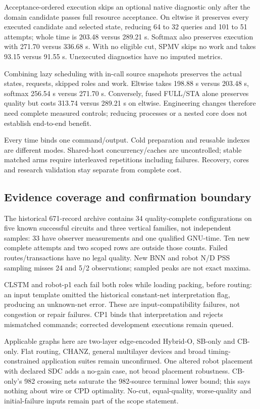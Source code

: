 \documentclass[conference,10pt]{IEEEtran}
\begin{document}
Acceptance-ordered execution skips an optional native diagnostic only after the domain candidate passes full resource acceptance. On eltwise it preserves every executed candidate and selected state, reducing 64 to 32 queries and 101 to 51 attempts; whole time is 203.48 versus 289.21 s. Softmax also preserves execution with 271.70 versus 336.68 s. With no eligible cut, SPMV skips no work and takes 93.15 versus 91.55 s. Unexecuted diagnostics have no imputed metrics.

Combining lazy scheduling with in-call source snapshots preserves the actual states, requests, skipped roles and work. Eltwise takes 198.88 s versus 203.48 s, softmax 256.54 s versus 271.70 s. Conversely, fused FULL/STA alone preserves quality but costs 313.74 versus 289.21 s on eltwise. Engineering changes therefore need complete measured controls; reducing processes or a nested core does not establish end-to-end benefit.

Every time binds one command/output. Cold preparation and reusable indexes are different modes. Shared-host concurrency/caches are uncontrolled; stable matched arms require interleaved repetitions including failures. Recovery, cores and research validation stay separate from complete cost.

\subsection{Evidence coverage and confirmation boundary}
The historical 671-record archive contains 34 quality-complete configurations on five known successful circuits and three vertical families, not independent samples: 33 have observer measurements and one qualified GNU-time. Ten new complete attempts and two scoped rows are outside those counts. Failed routes/transactions have no legal quality. New BNN and robot N/D PSS sampling misses 24 and 5/2 observations; sampled peaks are not exact maxima.

CLSTM and robot-p1 each fail both roles while loading packing, before routing: an input template omitted the historical constant-net interpretation flag, producing an unknown-net error. These are input-compatibility failures, not congestion or repair failures. CP1 binds that interpretation and rejects mismatched commands; corrected development executions remain queued.

Applicable graphs here are two-layer edge-encoded Hybrid-O, SB-only and CB-only. Flat routing, CHANZ, general multilayer devices and broad timing-constrained application suites remain unconfirmed. One altered robot placement with declared SDC adds a no-gain case, not broad placement robustness. CB-only's 982 crossing nets saturate the 982-source terminal lower bound; this says nothing about wire or CPD optimality. No-cut, equal-quality, worse-quality and initial-failure inputs remain part of the scope statement.
\end{document}
